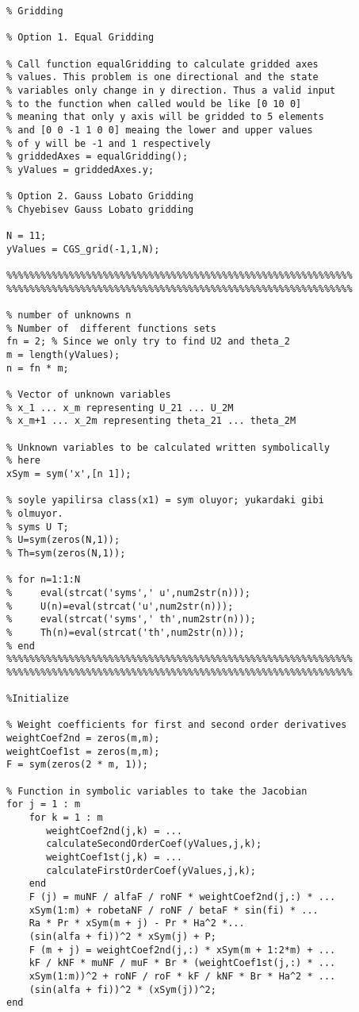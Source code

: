 \begin{lstlisting}
% Gridding 

% Option 1. Equal Gridding

% Call function equalGridding to calculate gridded axes 
% values. This problem is one directional and the state 
% variables only change in y direction. Thus a valid input 
% to the function when called would be like [0 10 0] 
% meaning that only y axis will be gridded to 5 elements 
% and [0 0 -1 1 0 0] meaing the lower and upper values 
% of y will be -1 and 1 respectively
% griddedAxes = equalGridding();
% yValues = griddedAxes.y;

% Option 2. Gauss Lobato Gridding
% Chyebisev Gauss Lobato gridding

N = 11;
yValues = CGS_grid(-1,1,N);

%%%%%%%%%%%%%%%%%%%%%%%%%%%%%%%%%%%%%%%%%%%%%%%%%%%%%%%%%%%%%
%%%%%%%%%%%%%%%%%%%%%%%%%%%%%%%%%%%%%%%%%%%%%%%%%%%%%%%%%%%%%

% number of unknowns n
% Number of  different functions sets 
fn = 2; % Since we only try to find U2 and theta_2
m = length(yValues);
n = fn * m;

% Vector of unknown variables 
% x_1 ... x_m representing U_21 ... U_2M
% x_m+1 ... x_2m representing theta_21 ... theta_2M

% Unknown variables to be calculated written symbolically 
% here
xSym = sym('x',[n 1]);

% soyle yapilirsa class(x1) = sym oluyor; yukardaki gibi 
% olmuyor.
% syms U T;
% U=sym(zeros(N,1));
% Th=sym(zeros(N,1));

% for n=1:1:N
%     eval(strcat('syms',' u',num2str(n)));
%     U(n)=eval(strcat('u',num2str(n)));
%     eval(strcat('syms',' th',num2str(n)));
%     Th(n)=eval(strcat('th',num2str(n)));
% end
%%%%%%%%%%%%%%%%%%%%%%%%%%%%%%%%%%%%%%%%%%%%%%%%%%%%%%%%%%%%%
%%%%%%%%%%%%%%%%%%%%%%%%%%%%%%%%%%%%%%%%%%%%%%%%%%%%%%%%%%%%%

%Initialize

% Weight coefficients for first and second order derivatives
weightCoef2nd = zeros(m,m);
weightCoef1st = zeros(m,m);
F = sym(zeros(2 * m, 1));

% Function in symbolic variables to take the Jacobian
for j = 1 : m
    for k = 1 : m
       weightCoef2nd(j,k) = ...
       calculateSecondOrderCoef(yValues,j,k);
       weightCoef1st(j,k) = ...
       calculateFirstOrderCoef(yValues,j,k);
    end 
    F (j) = muNF / alfaF / roNF * weightCoef2nd(j,:) * ... 
    xSym(1:m) + robetaNF / roNF / betaF * sin(fi) * ... 
    Ra * Pr * xSym(m + j) - Pr * Ha^2 *...
    (sin(alfa + fi))^2 * xSym(j) + P;
    F (m + j) = weightCoef2nd(j,:) * xSym(m + 1:2*m) + ...
    kF / kNF * muNF / muF * Br * (weightCoef1st(j,:) * ...
    xSym(1:m))^2 + roNF / roF * kF / kNF * Br * Ha^2 * ...
    (sin(alfa + fi))^2 * (xSym(j))^2;
end


\end{lstlisting}
